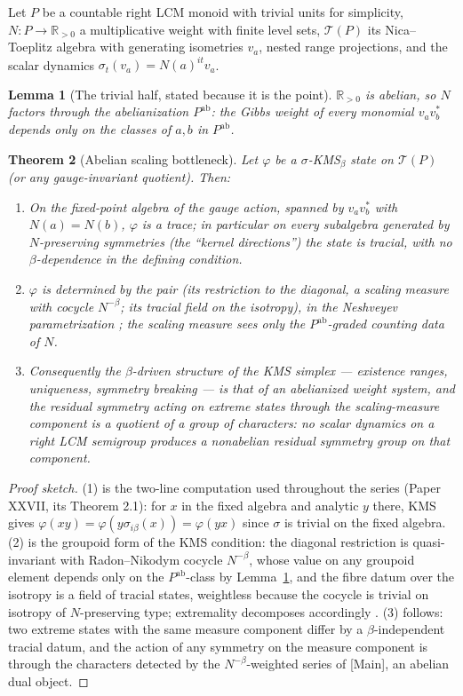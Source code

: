\documentclass[11pt]{amsart}
\newtheorem{theorem}{Theorem}[section]
\newtheorem{lemma}[theorem]{Lemma}
\theoremstyle{remark}
\newcommand{\R}{\mathbb{R}}
\begin{document}
Let $P$ be a countable right LCM monoid with trivial units for simplicity, $N:P\to
\R_{>0}$ a multiplicative weight with finite level sets, $\mathcal T(P)$ its Nica--Toeplitz
algebra with generating isometries $v_a$, nested range projections, and the scalar
dynamics $\sigma_t(v_a)=N(a)^{it}v_a$.

\begin{lemma}[The trivial half, stated because it is the point]\label{lem:ab}
$\R_{>0}$ is abelian, so $N$ factors through the abelianization $P^{\mathrm{ab}}$: the Gibbs
weight of every monomial $v_av_b^*$ depends only on the classes of $a,b$ in $P^{\mathrm{ab}}$.
\end{lemma}

\begin{theorem}[Abelian scaling bottleneck]\label{thm:bottleneck}
Let $\varphi$ be a $\sigma$-KMS$_\beta$ state on $\mathcal T(P)$ (or any gauge-invariant
quotient). Then:
\begin{enumerate}
\item On the fixed-point algebra of the gauge action, spanned by $v_av_b^*$ with
$N(a)=N(b)$, $\varphi$ is a trace; in particular on every subalgebra generated by
$N$-preserving symmetries (the ``kernel directions'') the state is tracial, with no
$\beta$-dependence in the defining condition.
\item $\varphi$ is determined by the pair (its restriction to the diagonal, a scaling
measure with cocycle $N^{-\beta}$; its tracial field on the isotropy), in the
Neshveyev parametrization \cite{Neshveyev}; the scaling measure sees only the
$P^{\mathrm{ab}}$-graded counting data of $N$.
\item Consequently the $\beta$-driven structure of the KMS simplex --- existence ranges,
uniqueness, symmetry breaking --- is that of an abelianized weight system, and the
residual symmetry acting on extreme states through the scaling-measure component is a
quotient of a group of characters: no scalar dynamics on a right LCM semigroup produces
a nonabelian residual symmetry group on that component.
\end{enumerate}
\end{theorem}

\begin{proof}[Proof sketch]
(1) is the two-line computation used throughout the series (Paper XXVII, its Theorem
2.1): for $x$ in the fixed algebra and analytic $y$ there, KMS gives
$\varphi(xy)=\varphi(y\sigma_{i\beta}(x))=\varphi(yx)$ since $\sigma$ is trivial on the
fixed algebra. (2) is the groupoid form of the KMS condition: the diagonal restriction is
quasi-invariant with Radon--Nikodym cocycle $N^{-\beta}$, whose value on any groupoid
element depends only on the $P^{\mathrm{ab}}$-class by Lemma~\ref{lem:ab}, and the fibre datum
over the isotropy is a field of tracial states, weightless because the cocycle is trivial
on isotropy of $N$-preserving type; extremality decomposes accordingly \cite{Neshveyev}.
(3) follows: two extreme states with the same measure component differ by a
$\beta$-independent tracial datum, and the action of any symmetry on the measure
component is through the characters detected by the $N^{-\beta}$-weighted series of
[Main], an abelian dual object.
\end{proof}
\end{document}

